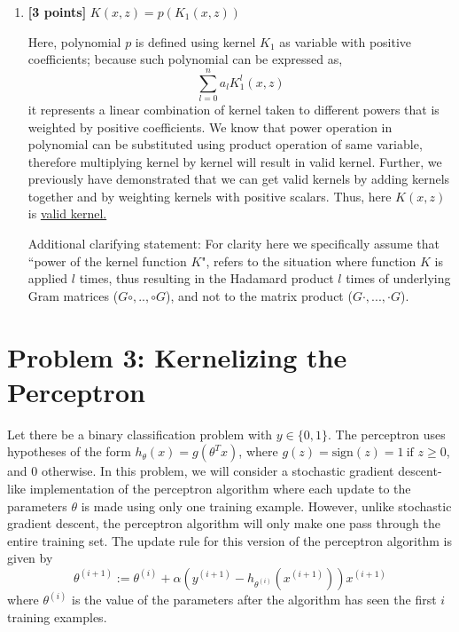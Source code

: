 \documentclass{article}
\begin{document}
\begin{enumerate}[label=\alph*)]


\item \textbf{[3 points]} $K(x, z) = p(K_1(x, z))$

Here, polynomial $p$ is defined using kernel $K_1$ as variable with positive coefficients; because such polynomial can be expressed as,
\[
\sum_{l=0}^{n}a_l K_1^l(x, z)
\]
it represents a linear combination of kernel taken to different powers that is weighted by positive coefficients. We know that power operation in polynomial can be substituted using product operation of same variable, therefore multiplying kernel by kernel will result in valid kernel. 
Further, we previously have demonstrated that we can get valid kernels by adding kernels together and by weighting kernels with positive scalars. Thus, here $K(x,z)$ is \underline{valid kernel.}

Additional clarifying statement: For clarity here we specifically assume that ``power of the kernel function $K$", refers to the situation where function $K$ is applied $l$ times, thus resulting in the Hadamard product $l$ times of underlying Gram matrices ($G\circ,..,\circ G$), and not to the matrix product ($G\cdot, ..., \cdot G$).






\end{enumerate}



\section*{Problem 3: Kernelizing the Perceptron}

Let there be a binary classification problem with $y \in \{0,1\}$. The perceptron uses hypotheses of the form $h_{\theta}(x) = g(\theta^T x)$, where $g(z) = \text{sign}(z) =  1 \ \text{if } z \geq 0 $, and $ 0$ otherwise. In this problem, we will consider a stochastic gradient descent-like implementation of the perceptron algorithm where each update to the parameters $\theta$ is made using only one training example. However, unlike stochastic gradient descent, the perceptron algorithm will only make one pass through the entire training set. The update rule for this version of the perceptron algorithm is given by
\[
\theta^{(i+1)} := \theta^{(i)} + \alpha \left( y^{(i+1)} - h_{\theta^{(i)}} (x^{(i+1)}) \right) x^{(i+1)}
\]
where $\theta^{(i)}$ is the value of the parameters after the algorithm has seen the first $i$ training examples.
\end{document}

